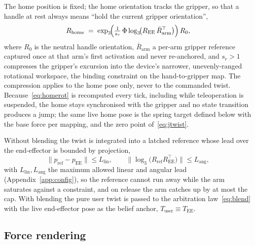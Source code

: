 The home position is fixed; the home orientation tracks the gripper, so that a handle at rest always means ``hold the current gripper orientation'',
\begin{equation}
R_{\text{home}} \;=\; \exp_3\!\Bigl(\tfrac{1}{s_r}\,\Phi \log_3\!\bigl(R_{\text{EE}}\,\bar{R}_{\text{arm}}^{\top}\bigr)\Bigr)\, R_0,
\label{eq:homerot}
\end{equation}
where $R_0$ is the neutral handle orientation, $\bar{R}_{\text{arm}}$ a per-arm gripper reference captured once at that arm's first activation and never re-anchored, and $s_r > 1$ compresses the gripper's excursion into the device's narrower, unevenly-ranged rotational workspace, the binding constraint on the hand-to-gripper map. The compression applies to the home pose only, never to the commanded twist. Because~\eqref{eq:homerot} is recomputed every tick, including while teleoperation is suspended, the home stays synchronised with the gripper and no state transition produces a jump; the same live home pose is the spring target defined below with the base force per mapping, and the zero point of~\eqref{eq:jtwist}.

Without blending the twist is integrated into a latched reference whose lead over the end-effector is bounded by projection,
\begin{equation}
\|p_{\text{ref}} - p_{\text{EE}}\| \le L_{\text{lin}},
\qquad
\bigl\|\log_3\!\bigl(R_{\text{ref}} R_{\text{EE}}^{\top}\bigr)\bigr\| \le L_{\text{ang}},
\label{eq:latchlead}
\end{equation}
with $L_{\text{lin}}, L_{\text{ang}}$ the maximum allowed linear and angular lead (Appendix~\ref{app:config}), so the reference cannot run away while the arm saturates against a constraint, and on release the arm catches up by at most the cap. With blending the pure user twist is passed to the arbitration law~\eqref{eq:blend} with the live end-effector pose as the belief anchor, $T_{\text{user}} \equiv T_{\text{EE}}$.

\subsection{Force rendering}
\label{sec:rendering}

